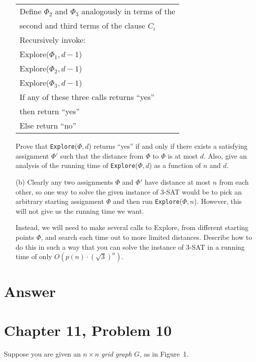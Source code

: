 \documentclass[12pt,letterpaper]{article}
\begin{document}
\begin{itemize}
\begin{table}[h!]
{\begin{tabular}{l}
\hspace{4em}Define $\Phi_2$ and $\Phi_3$ analogously in terms of the\\
\hspace{6em}second and third terms of the clause $C_i$\\
\hspace{4em}Recursively invoke:\\
\hspace{6em}Explore($\Phi_1, d-1$)\\
\hspace{6em}Explore($\Phi_2, d-1$)\\
\hspace{6em}Explore($\Phi_3, d-1$)\\
\hspace{4em}If any of these three calls returns ``yes''\\
\hspace{6em}then return ``yes''\\
\hspace{4em}Else return ``no''\\
\hline
\end{tabular}
}
\end{table}

Prove that {\tt Explore}($\Phi, d$) returns ``yes'' if and only if there exists
a satisfying assignment $\Phi'$ such that the distance from $\Phi$ to $\Phi$ is at
most $d$. Also, give an analysis of the running time of {\tt Explore}($\Phi, d$)
as a function of $n$ and $d$.

\item[(b)] Clearly any two assignments $\Phi$ and $\Phi'$ have distance at most $n$
from each other, so one way to solve the given instance of 3-SAT
would be to pick an arbitrary starting assignment $\Phi$ and then run
{\tt Explore}($\Phi, n$). However, this will not give us the running time we
want.

Instead, we will need to make several calls to Explore, from
different starting points $\Phi$, and search each time out to more limited
distances. Describe how to do this in such a way that you can solve
the instance of 3-SAT in a running time of only $O(p(n)\cdot(\sqrt{3})^n)$.
\end{itemize}

\section*{Answer}

\section*{Chapter 11, Problem 10}
Suppose you are given an $n \times n$ {\em grid graph} $G$, as in Figure~1.
\end{document}
